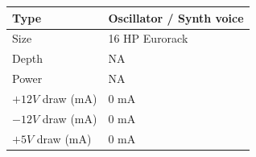 \documentclass[12pt,letter]{article}
\begin{document}
\begin{table}[!htp]
\begin{tabular}{|l|l|}
\hline
Type             & Oscillator / Synth voice \\
\hline
Size             & 16 HP Eurorack           \\
\hline
Depth            & NA                       \\
\hline
Power            & NA                       \\ %
\hline
$+12V$ draw (mA) & 0 mA                     \\
\hline
$-12V$ draw (mA) & 0 mA                     \\
\hline
$+5V$ draw (mA)  & 0 mA                     \\
\hline
\end{tabular}
\end{table}


\clearpage
\renewcommand\refname{References}
\nocite{*}


\end{document}

